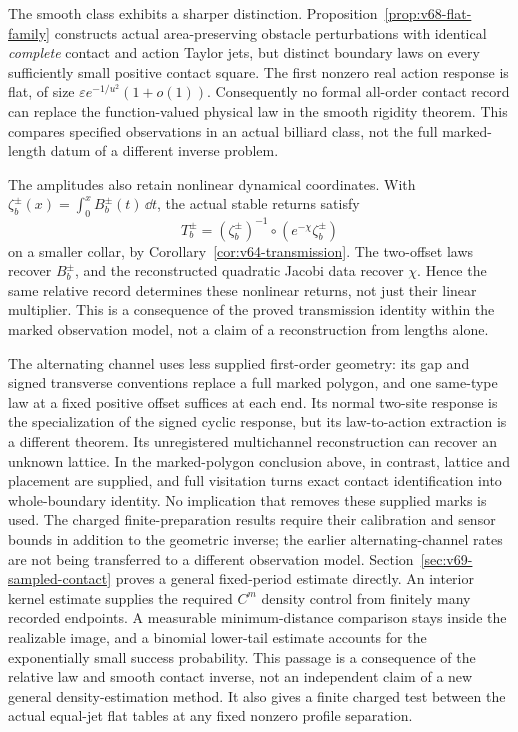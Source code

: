 The smooth class exhibits a sharper distinction.  Proposition~\ref{prop:v68-flat-family}
constructs actual area-preserving obstacle perturbations with identical
\emph{complete} contact and action Taylor jets, but distinct boundary
laws on every sufficiently small positive contact square.  The first
nonzero real action response is flat, of size
$\varepsilon e^{-1/u^2}(1+o(1))$.  Consequently no formal all-order
contact record can replace the function-valued physical law in the smooth
rigidity theorem.  This compares specified observations in an actual
billiard class, not the full marked-length datum of a different inverse
problem.

The amplitudes also retain nonlinear dynamical coordinates.  With
$\zeta_b^\pm(x)=\int_0^x B_b^\pm(t)\,\dd t$, the actual stable
returns satisfy
\[
 T_b^\pm=(\zeta_b^\pm)^{-1}\circ
                (e^{-\chi}\zeta_b^\pm)
\]
on a smaller collar, by Corollary~\ref{cor:v64-transmission}.
The two-offset laws recover $B_b^\pm$, and the reconstructed quadratic
Jacobi data recover $\chi$.  Hence the same relative record determines
these nonlinear returns, not just their linear multiplier.  This is
a consequence of the proved transmission identity within the marked
observation model, not a claim of a reconstruction from lengths alone.

The alternating channel uses less supplied first-order geometry: its gap
and signed transverse conventions replace a full marked polygon, and one
same-type law at a fixed positive offset suffices at each end.  Its
normal two-site response is the specialization of the signed cyclic
response, but its law-to-action extraction is a different theorem.  Its
unregistered multichannel reconstruction can recover an unknown lattice.
In the marked-polygon conclusion above, in contrast, lattice and placement
are supplied, and full visitation turns exact contact identification into
whole-boundary identity.  No implication that removes these supplied
marks is used.  The charged finite-preparation results require their
calibration and sensor bounds in addition to the geometric inverse;
the earlier alternating-channel rates are not being transferred to a
different observation model.  Section~\ref{sec:v69-sampled-contact}
proves a general fixed-period estimate directly.  An interior kernel
estimate supplies the required $C^m$ density control from finitely many
recorded endpoints.  A measurable minimum-distance comparison stays
inside the realizable image, and a binomial lower-tail estimate accounts
for the exponentially small success probability.  This passage is a
consequence of the relative law and smooth contact inverse, not an
independent claim of a new general density-estimation method.  It also
gives a finite charged test between the actual equal-jet flat tables at
any fixed nonzero profile separation.

